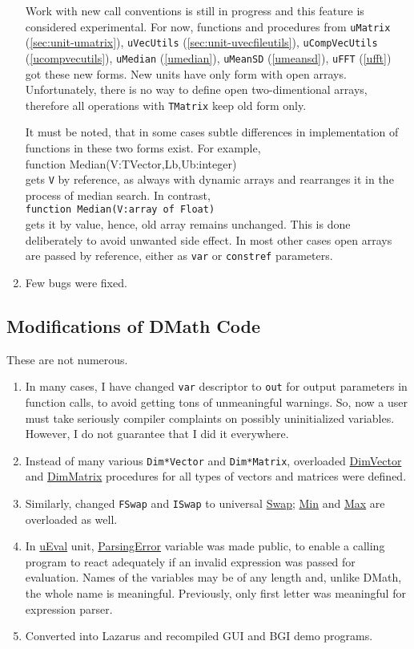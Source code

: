 \documentclass[12pt,a4paper,oneside]{report}
\newcommand{\code}[1]{\texttt{#1}}
\begin{document}
\begin{enumerate}
{		Work with new call conventions is still in progress and this feature is considered experimental. For now, functions and procedures from \code{uMatrix} (\ref{sec:unit-umatrix}), \code{uVecUtils} (\ref{sec:unit-uvecfileutils}), \code{uCompVecUtils} (\ref{ucompvecutils}), \code{uMedian} (\ref{umedian}), \code{uMeanSD} (\ref{umeansd}), \code{uFFT} (\ref{ufft}) got these new forms. New units have only form with open arrays. Unfortunately, there is no way to define open two-dimentional arrays, therefore all operations with \code{TMatrix} keep old form only. 
		
		It must be noted, that in some cases subtle differences in implementation of functions in these two forms exist. For example,\\[4pt] function Median(V:TVector,Lb,Ub:integer)\\[4pt] gets \code{V} by reference, as always with dynamic arrays and rearranges it in the process of median search. In contrast,\\[4pt] \code{function Median(V:array of Float)}\\[4pt] gets it by value, hence, old array remains unchanged. This is done deliberately to avoid unwanted side effect. In most other cases open arrays are passed by reference, either as \code{var} or \code{constref} parameters.}
	\item{Few bugs were fixed.}
\end{enumerate}

\subsection*{Modifications of DMath Code}  
These are not numerous. 
\begin{enumerate}
	\item In many cases, I have changed \code{var} descriptor to \code{out} for output parameters in function calls, to avoid getting tons of unmeaningful warnings. So, now a user must take seriously compiler complaints on possibly uninitialized variables. However, I do not guarantee that I did it everywhere.
	\item Instead of many various \code{Dim*Vector} and \code{Dim*Matrix}, overloaded \hyperref[utypes-DimVector]{DimVector} and \hyperref[utypes-DimMatrix]{DimMatrix} procedures for all types of vectors and matrices were defined.
	\item Similarly, changed \code{FSwap} and \code{ISwap} to universal \hyperref[uminmax-Swap]{Swap}; \hyperref[uminmax-Min]{Min} and \hyperref[uminmax-Min]{Max} are overloaded as well.
	\item In \hyperref[ueval]{uEval} unit, \hyperref[ueval-parsingerror]{ParsingError} variable was made public, to enable a calling program to react adequately if an invalid expression was passed for evaluation. Names of the variables may be of any length and, unlike DMath, the whole name is meaningful. Previously, only first letter was meaningful for expression parser.
	\item Converted into Lazarus and recompiled GUI and BGI demo programs.
\end{enumerate}
\end{document}
